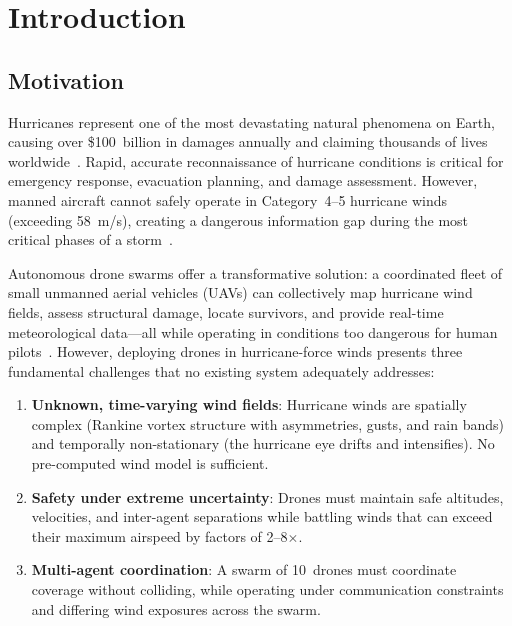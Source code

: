 \documentclass[11pt,twocolumn]{article}
\theoremstyle{definition}
\begin{document}
\section{Introduction}
\label{sec:introduction}

\subsection{Motivation}
\label{sec:motivation}

Hurricanes represent one of the most devastating natural phenomena on Earth, causing over \$100~billion in damages annually and claiming thousands of lives worldwide~\citep{NOAA2023}. Rapid, accurate reconnaissance of hurricane conditions is critical for emergency response, evacuation planning, and damage assessment. However, manned aircraft cannot safely operate in Category~4--5 hurricane winds (exceeding 58~m/s), creating a dangerous information gap during the most critical phases of a storm~\citep{NOAAHurricane2020}.

Autonomous drone swarms offer a transformative solution: a coordinated fleet of small unmanned aerial vehicles (UAVs) can collectively map hurricane wind fields, assess structural damage, locate survivors, and provide real-time meteorological data---all while operating in conditions too dangerous for human pilots~\citep{Prudden2018,Fisher2016}. However, deploying drones in hurricane-force winds presents three fundamental challenges that no existing system adequately addresses:

\begin{enumerate}[leftmargin=*]
    \item \textbf{Unknown, time-varying wind fields}: Hurricane winds are spatially complex (Rankine vortex structure with asymmetries, gusts, and rain bands) and temporally non-stationary (the hurricane eye drifts and intensifies). No pre-computed wind model is sufficient.
    
    \item \textbf{Safety under extreme uncertainty}: Drones must maintain safe altitudes, velocities, and inter-agent separations while battling winds that can exceed their maximum airspeed by factors of 2--8$\times$.
    
    \item \textbf{Multi-agent coordination}: A swarm of 10~drones must coordinate coverage without colliding, while operating under communication constraints and differing wind exposures across the swarm.
\end{enumerate}
\end{document}
